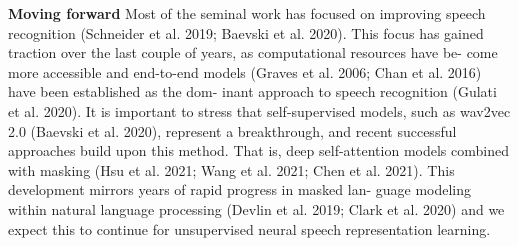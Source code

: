 \textbf{Moving forward} Most of the seminal work has focused on improving speech recognition (Schneider et al. 2019; Baevski et al. 2020). This focus has gained traction over the last couple of years, as computational resources have be- come more accessible and end-to-end models (Graves et al. 2006; Chan et al. 2016) have been established as the dom- inant approach to speech recognition (Gulati et al. 2020). It is important to stress that self-supervised models, such as wav2vec 2.0 (Baevski et al. 2020), represent a breakthrough, and recent successful approaches build upon this method. That is, deep self-attention models combined with masking (Hsu et al. 2021; Wang et al. 2021; Chen et al. 2021). This development mirrors years of rapid progress in masked lan- guage modeling within natural language processing (Devlin et al. 2019; Clark et al. 2020) and we expect this to continue for unsupervised neural speech representation learning.
